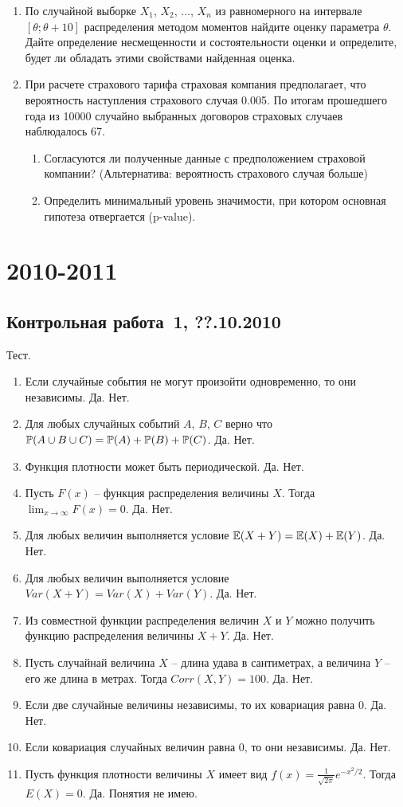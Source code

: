 \documentclass[pdftex,12pt,a4paper]{article}
\begin{document}
\begin{enumerate}
\item По случайной выборке $X_1$, $X_2$, ..., $X_n$ из равномерного на интервале $[\theta;\theta+10]$ распределения методом моментов найдите оценку параметра $\theta$. Дайте определение несмещенности и состоятельности оценки и определите, будет ли обладать этими свойствами найденная оценка.

\item При расчете страхового тарифа страховая компания предполагает, что вероятность наступления страхового случая 0.005. По итогам прошедшего года из 10000 случайно выбранных договоров страховых случаев наблюдалось 67. 
\begin{enumerate}
\item Согласуются ли полученные данные с предположением страховой компании? (Альтернатива: вероятность страхового случая больше)
\item Определить минимальный уровень значимости, при котором основная гипотеза отвергается (p-value).
\end{enumerate}
\end{enumerate}


\section{2010-2011}


\subsection{Контрольная работа \No\,1, ??.10.2010}

Тест.

\begin{enumerate}
\item Если случайные события не могут произойти одновременно, то они независимы. Да. Нет.
\item  Для любых случайных событий $A$, $B$, $C$ верно что $\P(A\cup B\cup C)=\P(A)+\P(B)+\P(C)$. Да. Нет. 
\item  Функция плотности может быть периодической. Да. Нет.
\item  Пусть $F(x)$ -- функция распределения величины $X$. Тогда $\lim_{x\to\infty} F(x)=0$. Да. Нет.
\item  Для любых величин выполняется условие $\E(X+Y)=\E(X)+\E(Y)$. Да. Нет.
\item  Для любых величин выполняется условие $Var(X+Y)=Var(X)+Var(Y)$. Да. Нет.
\item  Из совместной функции распределения величин $X$ и $Y$ можно получить функцию распределения величины $X+Y$. Да. Нет.
\item  Пусть случайнай величина $X$ -- длина удава в сантиметрах, а величина $Y$ -- его же длина в метрах. Тогда $Corr(X,Y)=100$. Да. Нет.
\item  Если две случайные величины независимы, то их ковариация равна 0. Да. Нет.
\item  Если ковариация случайных величин равна 0, то они независимы. Да. Нет.
\item  Пусть функция плотности величины $X$ имеет вид  $f(x)=\frac{1}{\sqrt{2\pi}}e^{-x^2/2}$. Тогда $E(X)=0$. Да. Понятия не имею.
\end{enumerate}
\end{document}
